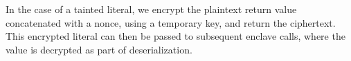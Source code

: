 In the case of a tainted literal, we encrypt the plaintext return value concatenated with a nonce, using a temporary key, and return the ciphertext.
This encrypted literal can then be passed to subsequent enclave calls, where the value is decrypted as part of deserialization.







